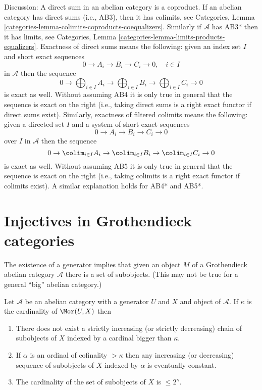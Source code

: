 \noindent
Discussion: A direct sum in an abelian category is a coproduct.
If an abelian category has direct sums (i.e., AB3), then it has colimits, see
Categories, Lemma \ref{categories-lemma-colimits-coproducts-coequalizers}. 
Similarly if $\mathcal{A}$ has AB3* then it has limits, see
Categories, Lemma \ref{categories-lemma-limits-products-equalizers}. 
Exactness of direct sums means the following: given an index set $I$
and short exact sequences
$$
0 \to A_i \to B_i \to C_i \to 0,\quad i \in I
$$
in $\mathcal{A}$ then the sequence
$$
0 \to
\bigoplus\nolimits_{i \in I} A_i \to
\bigoplus\nolimits_{i \in I} B_i \to
\bigoplus\nolimits_{i \in I} C_i \to 0
$$
is exact as well. Without assuming AB4 it is only true in general that
the sequence is exact on the right (i.e., taking direct sums is a right
exact functor if direct sums exist). Similarly, exactness of filtered
colimits means the following: given a directed set $I$
and a system of short exact sequences
$$
0 \to A_i \to B_i \to C_i \to 0
$$
over $I$ in $\mathcal{A}$ then the sequence
$$
0 \to
\colim_{i \in I} A_i \to
\colim_{i \in I} B_i \to
\colim_{i \in I} C_i \to 0
$$
is exact as well. Without assuming AB5 it is only true in general that
the sequence is exact on the right (i.e., taking colimits is a right
exact functor if colimits exist). A similar explanation holds for
AB4* and AB5*.



\section{Injectives in Grothendieck categories}
\label{section-grothendieck-categories}

\noindent
The existence of a generator implies that given an object $M$ of a
Grothendieck abelian category $\mathcal{A}$ there is a set of subobjects.
(This may not be true for a general ``big'' abelian category.)

\begin{lemma}
\label{lemma-set-of-subobjects}
Let $\mathcal{A}$ be an abelian category with a generator $U$ and
$X$ and object of $\mathcal{A}$. If $\kappa$ is the cardinality of
$\Mor(U, X)$ then
\begin{enumerate}
\item There does not exist a strictly increasing
(or strictly decreasing) chain of subobjects
of $X$ indexed by a cardinal bigger than $\kappa$.
\item If $\alpha$ is an ordinal of cofinality $> \kappa$
then any increasing (or decreasing) sequence of subobjects
of $X$ indexed by $\alpha$ is eventually constant.
\item The cardinality of the set of subobjects of $X$
is $\leq 2^\kappa$.
\end{enumerate}
\end{lemma}

